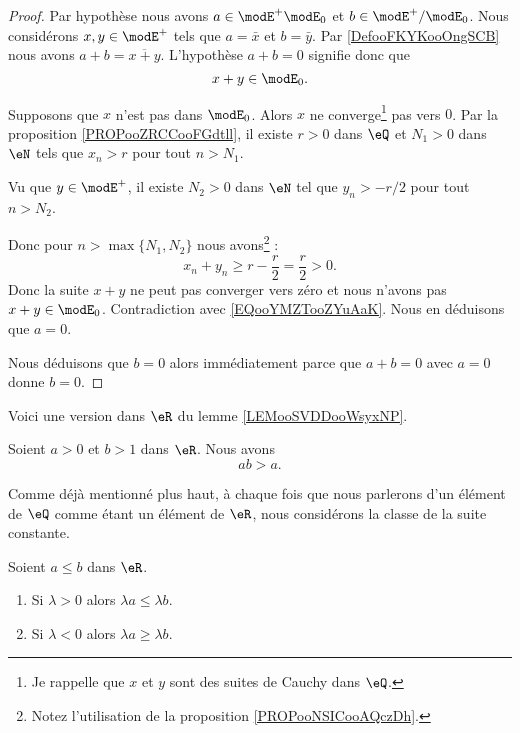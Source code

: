 \begin{proof}
	Par hypothèse nous avons \( a\in \modE^+\modE_0\) et \( b\in \modE^+/\modE_0\). Nous considérons \( x,y\in \modE^+\) tels que \( a=\bar x\) et \( b=\bar y\). Par \ref{DefooFKYKooOngSCB} nous avons \( a+b=\overline{x+y}\). L'hypothèse \( a+b=0\) signifie donc que
	\begin{equation}		\label{EQooYMZTooZYuAaK}
		x+y\in\modE_0.
	\end{equation}

	Supposons que \( x\) n'est pas dans \( \modE_0\). Alors \( x\) ne converge\footnote{Je rappelle que \( x\) et \( y\) sont des suites de Cauchy dans \( \eQ\).} pas vers \( 0\). Par la proposition \ref{PROPooZRCCooFGdtll}, il existe \( r>0\) dans \( \eQ\) et \( N_1>0\) dans \( \eN\) tels que \( x_n>r\) pour tout \( n>N_1\).

	Vu que \( y\in \modE^+\), il existe \( N_2>0\) dans \( \eN\) tel que \( y_n>-r/2\) pour tout \( n>N_2\).

	Donc pour \( n>\max\{ N_1,N_2 \}\) nous avons\footnote{Notez l'utilisation de la proposition \ref{PROPooNSICooAQczDh}.} :
	\begin{equation}
		x_n+y_n\geq r-\frac{ r }{2}=\frac{ r }{2}>0.
	\end{equation}
	Donc la suite \( x+y\) ne peut pas converger vers zéro et nous n'avons pas \( x+y\in\modE_0\). Contradiction avec \eqref{EQooYMZTooZYuAaK}. Nous en déduisons que \( a=0\).

	Nous déduisons que \( b=0\) alors immédiatement parce que \( a+b=0\) avec \( a=0\) donne \( b=0\).
\end{proof}

Voici une version dans \( \eR\) du lemme \ref{LEMooSVDDooWsyxNP}.
\begin{lemma}       \label{LEMooKAXFooIPyzJC}
	Soient \( a>0\) et \( b>1\) dans \( \eR\). Nous avons
	\begin{equation}
		ab>a.
	\end{equation}
\end{lemma}

\begin{remark}
	Comme déjà mentionné plus haut, à chaque fois que nous parlerons d'un élément de \( \eQ\) comme étant un élément de \( \eR\), nous considérons la classe de la suite constante.
\end{remark}

\begin{proposition}	\label{PROPooWYPNooCcBERG}
	Soient \( a\leq b\) dans \( \eR\).
	\begin{enumerate}
		\item
		      Si \( \lambda>0\) alors \( \lambda a\leq \lambda b\).
		\item
		      Si \( \lambda <0\) alors \( \lambda a\geq \lambda b\).
	\end{enumerate}
\end{proposition}


